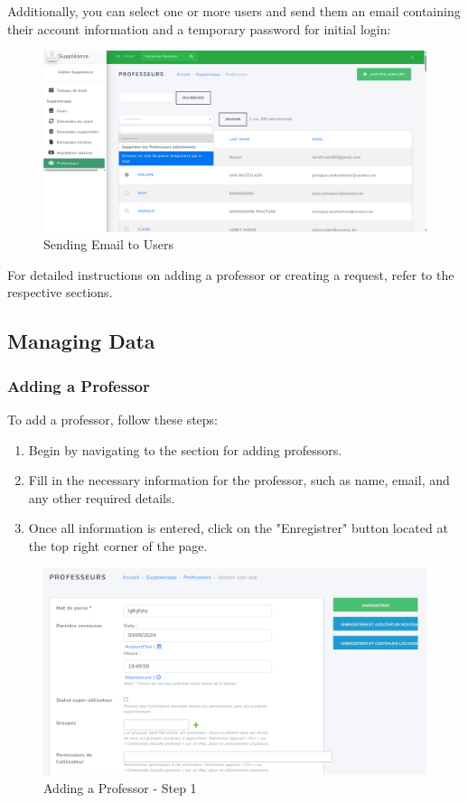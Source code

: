 \documentclass[12pt]{article}
\begin{document}
Additionally, you can select one or more users and send them an email containing their account information and a temporary password for initial login:

\begin{figure}[H]
    \centering
    \includegraphics[width=0.75\linewidth]{image38.png}
    \caption{Sending Email to Users}
\end{figure}

For detailed instructions on adding a professor or creating a request, refer to the respective sections.
\subsection{Managing Data}

\subsubsection{Adding a Professor}  \label{11}

To add a professor, follow these steps:

\begin{enumerate}
    \item Begin by navigating to the section for adding professors.
    \item Fill in the necessary information for the professor, such as name, email, and any other required details.
    \item Once all information is entered, click on the "Enregistrer" button located at the top right corner of the page.
\end{enumerate}

\begin{figure}[H]
    \centering
    \includegraphics[width=0.75\linewidth]{image40.png}
    \caption{Adding a Professor - Step 1}
\end{figure}
\end{document}
